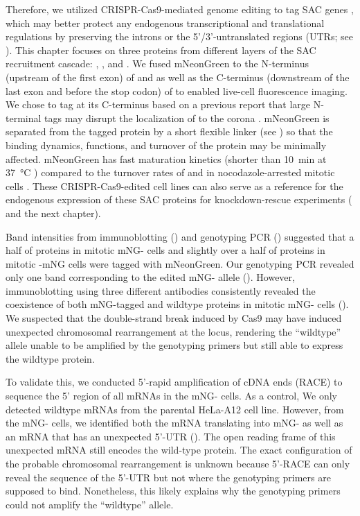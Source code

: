 Therefore, we utilized CRISPR-Cas9-mediated genome editing to tag SAC genes  \cite{HDRTiming}, which may better protect any endogenous transcriptional and translational regulations by preserving the introns or the 5'/3'-untranslated regions (UTRs; see ). This chapter focuses on three proteins from different layers of the SAC recruitment cascade: , , and . We fused mNeonGreen to the N-terminus (upstream of the first exon) of  and  as well as the C-terminus (downstream of the last exon and before the stop codon) of  to enabled live-cell fluorescence imaging. We chose to tag  at its C-terminus based on a previous report that large N-terminal tags may disrupt the localization of  to the corona \cite{CoronaActivatesSAC}. mNeonGreen is separated from the tagged protein by a short flexible linker (see ) so that the binding dynamics, functions, and turnover of the protein may be minimally affected. mNeonGreen has fast maturation kinetics (shorter than \SI{10}{min} at \SI{37}{\celsius} \cite{mNG}) compared to the turnover rates of  and  in nocodazole-arrested mitotic cells \cite{BubR1MitosisTurnover, Bub1MitosisTurnover}. These CRISPR-Cas9-edited cell lines can also serve as a reference for the endogenous expression of these SAC proteins for knockdown-rescue experiments ( and the next chapter).

Band intensities from immunoblotting () and genotyping PCR () suggested that a half of  proteins in mitotic mNG- cells and slightly over a half of  proteins in mitotic -mNG cells were tagged with mNeonGreen. Our genotyping PCR revealed only one band corresponding to the edited mNG- allele (). However, immunoblotting using three different antibodies consistently revealed the coexistence of both mNG-tagged and wildtype  proteins in mitotic mNG- cells (). We suspected that the double-strand break induced by Cas9 may have induced unexpected chromosomal rearrangement at the  locus, rendering the ``wildtype'' allele unable to be amplified by the genotyping primers but still able to express the wildtype  protein.

To validate this, we conducted 5'-rapid amplification of cDNA ends (RACE) to sequence the 5' region of all  mRNAs in the mNG- cells. As a control, We only detected wildtype  mRNAs from the parental HeLa-A12 cell line. However, from the mNG- cells, we identified both the mRNA translating into mNG- as well as an mRNA that has an unexpected 5'-UTR (). The open reading frame of this unexpected mRNA still encodes the wild-type  protein. The exact configuration of the probable chromosomal rearrangement is unknown because 5'-RACE can only reveal the sequence of the 5'-UTR but not where the genotyping primers are supposed to bind. Nonetheless, this likely explains why the genotyping primers could not amplify the ``wildtype'' allele.

